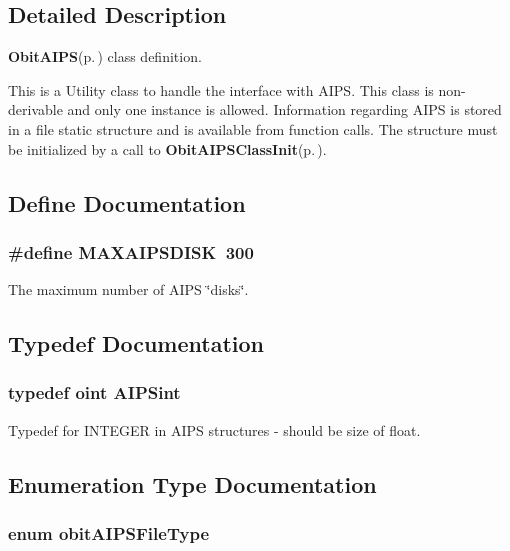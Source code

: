 \subsection{Detailed Description}
{\bf Obit\-AIPS}{\rm (p.\,\pageref{structObitAIPS})} class definition. 

This is a Utility class to handle the interface with AIPS. This class is non-derivable and only one instance is allowed. Information regarding AIPS is stored in a file static structure and is available from function calls. The structure must be initialized by a call to {\bf Obit\-AIPSClass\-Init}{\rm (p.\,\pageref{ObitAIPS_8c_a5})}.

\subsection{Define Documentation}
\subsubsection{\setlength{\rightskip}{0pt plus 5cm}\#define MAXAIPSDISK\ 300}\label{ObitAIPS_8h_a0}


The maximum number of AIPS \char`\"{}disks\char`\"{}. 



\subsection{Typedef Documentation}
\subsubsection{\setlength{\rightskip}{0pt plus 5cm}typedef {\bf oint} {\bf AIPSint}}\label{ObitAIPS_8h_a1}


Typedef for INTEGER in AIPS structures - should be size of float. 



\subsection{Enumeration Type Documentation}
\subsubsection{\setlength{\rightskip}{0pt plus 5cm}enum {\bf obit\-AIPSFile\-Type}}\label{ObitAIPS_8h_a30}




